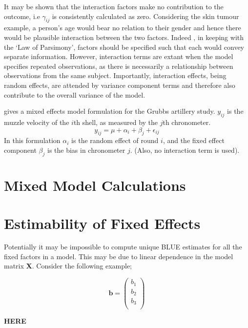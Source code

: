 \documentclass[12pt, a4paper]{report}
\theoremstyle{plain}
\theoremstyle{definition}
\theoremstyle{remark}
\begin{document}
It may be shown that the interaction factors make no contribution
to the outcome, i.e $\gamma_{ij}$ is consistently calculated as
zero. Considering the skin tumour example, a person's age would
bear no relation to their gender and hence there would be
plausible interaction between the two factors. Indeed , in keeping
with the `Law of Parsimony', factors should be specified such that
each would convey separate information. However, interaction terms
are extant when the model specifies repeated observations, as
there is necessarily a relationship between observations from the
same subject. Importantly, interaction effects, being random
effects, are attended by variance component terms and therefore
also contribute to the overall variance of the model.

\citet{Searle} gives a mixed effects model formulation for the
Grubbs artillery study. $y_{ij}$ is the muzzle velocity of the
$i$th shell, as measured by the $j$th chronometer.
\begin{equation}
y_{ij} = \mu + \alpha_{i} + \beta_{j}  + \epsilon_{ij}
\end{equation}
In this formulation $\alpha_{i}$ is the random effect of round
$i$, and the fixed effect component $\beta_{j}$ is the bias in
chronometer $j$. (Also, no interaction term is used).



\section{Mixed Model Calculations}


\section{Estimability of Fixed Effects}
Potentially it may be impossible to compute unique BLUE estimates for all the fixed factors in a model. This may be due to linear dependence in the model
matrix \textbf{X}. Consider the following example;


\begin{equation}
\textbf{b}= \left( \begin{array}{c}
b_{1} \\
b_{2} \\
b_{3} \\
\end{array}  \right)
\end{equation}

\textbf{HERE}
\end{document}
